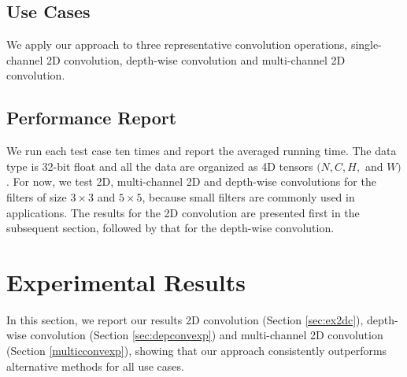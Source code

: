 \subsection{Use Cases}
We apply our approach to three representative convolution operations, single-channel 2D convolution, depth-wise convolution and
multi-channel 2D convolution.

 

 

 


\subsection{Performance Report} We run each test case ten times and report the averaged running time. The data type is 32-bit float and all the data are
organized as 4D tensors $(N,C,H,$ and $W)$. For now, we test 2D, multi-channel 2D and depth-wise convolutions for the filters of size $3
\times 3$ and $5 \times 5$, because small filters are commonly used in applications. The results for the 2D convolution are presented first
in the subsequent section, followed by that for the depth-wise convolution.

\section{Experimental Results}
\label{exp} In this section, we report our results 2D convolution (Section \ref{sec:ex2dc}), depth-wise convolution (Section
\ref{sec:depconvexp}) and multi-channel 2D convolution (Section \ref {multicconvexp}), showing that our approach consistently outperforms
alternative methods for all use cases. 


